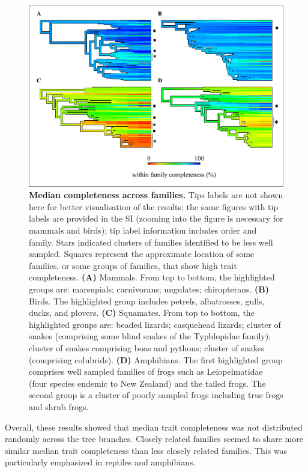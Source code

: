 \begin{figure}[h!]
\centering
\includegraphics[scale=0.9]{figures/chapter2/NA_phylo_patterns/Completeness_all_2}
\caption[Median completeness across families]{\textbf{Median completeness across families.} Tips labels are not shown here for better visualisation of the results; the same figures with tip labels are provided in the SI (zooming into the figure is necessary for mammals and birds); tip label information includes order and family.
Stars indicated clusters of families identified to be less well sampled. Squares represent the approximate location of some families, or some groups of families, that show high trait completeness. \textbf{(A)} Mammals. From top to bottom, the highlighted groups are: marsupials; carnivorans; ungulates; chiropterans.  \textbf{(B)} Birds. The highlighted group includes petrels, albatrosses, gulls, ducks,  and plovers. \textbf{(C)} Squamates. From top to bottom, the highlighted groups are: beaded lizards; casquehead lizards; cluster of snakes (comprising some blind snakes of the Typhlopidae family); cluster of snakes comprising boas and pythons; cluster of snakes (comprising colubrids). \textbf{(D)} Amphibians. The first highlighted group comprises well sampled families of frogs such as Leiopelmatidae (four species endemic to New Zealand) and the tailed frogs. The second group is a cluster of poorly sampled frogs including true frogs and shrub frogs.}
\label{classcomp}
\end{figure}

Overall, these results showed that median trait completeness was not distributed randomly across the tree branches. Closely related families seemed to share more similar median trait completeness than less closely related families. This was particularly emphasized in reptiles and amphibians.

